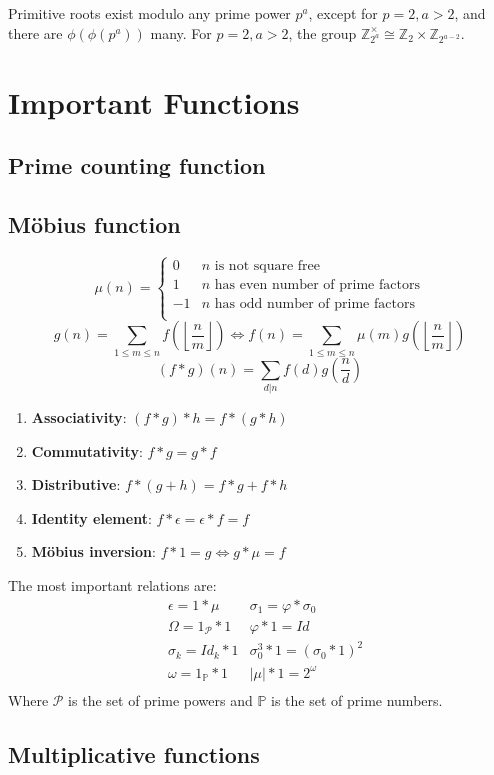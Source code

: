 	Primitive roots exist modulo any prime power $p^a$, except for $p = 2, a > 2$, and there are $\phi(\phi(p^a))$ many.
	For $p = 2, a > 2$, the group $\mathbb Z_{2^a}^\times \cong \mathbb Z_2 \times \mathbb Z_{2^{a-2}}$.



\section{Important Functions}
\subsection{Prime counting function}
\subsection{Möbius function}
\[
	\mu(n) = \begin{cases} 0 & n \textrm{ is not square free}\\ 1 & n \textrm{ has even number of prime factors}\\ -1 & n \textrm{ has odd number of prime factors}\\\end{cases}
\]
 \[ g(n) = \sum_{1 \leq m \leq n} f\left(\left\lfloor\frac{n}{m}\right \rfloor \right) \Leftrightarrow f(n) = \sum_{1\leq m\leq n} \mu(m)g\left(\left\lfloor\frac{n}{m}\right\rfloor\right)\]
 \[(f*g)(n)= \sum_{d|n}f(d)g\left(\frac{n}{d}\right)\]
 \begin{enumerate}
	\item \textbf{Associativity}: $(f*g)*h = f*(g*h)$
	\item \textbf{Commutativity}: $f*g = g*f$
	\item \textbf{Distributive}: $f*(g+h) = f*g + f*h$
	\item \textbf{Identity element}: $f*\epsilon = \epsilon*f=f$
	\item \textbf{Möbius inversion}: $f*1=g \iff g*\mu=f$
 \end{enumerate}

 The most important relations are:
 \begin{align*}
	&\epsilon = 1*\mu & \sigma_1 =\varphi * \sigma_0 \\
	&\Omega = 1_{\mathcal{P}}*1 & \varphi * 1 = Id \\
	&\sigma_k = Id_k* 1 & \sigma_0^3*1 = (\sigma_0 *1)^2 \\
	&\omega = 1_{\mathbb{P}}*1 & |\mu|*1= 2^\omega \\
 \end{align*}
 Where $\mathcal{P}$ is the set of prime powers and $\mathbb{P}$ is the set of prime numbers.
\subsection{Multiplicative functions}
